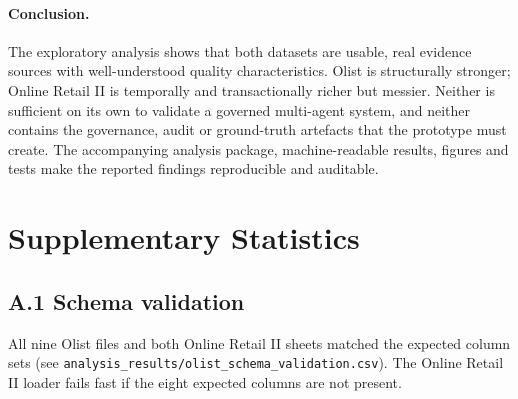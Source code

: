 \documentclass[11pt,a4paper]{article}
\newcommand{\code}[1]{\texttt{#1}}
\begin{document}
\paragraph{Conclusion.}
The exploratory analysis shows that both datasets are usable, real evidence sources with well-understood quality characteristics. Olist is structurally stronger; Online Retail II is temporally and transactionally richer but messier. Neither is sufficient on its own to validate a governed multi-agent system, and neither contains the governance, audit or ground-truth artefacts that the prototype must create. The accompanying analysis package, machine-readable results, figures and tests make the reported findings reproducible and auditable.




\appendix
\section{Supplementary Statistics}
\label{app:supp}
\subsection*{A.1 Schema validation}
All nine Olist files and both Online Retail II sheets matched the expected column sets (see \code{analysis\_results/olist\_schema\_validation.csv}). The Online Retail II loader fails fast if the eight expected columns are not present.
\end{document}
